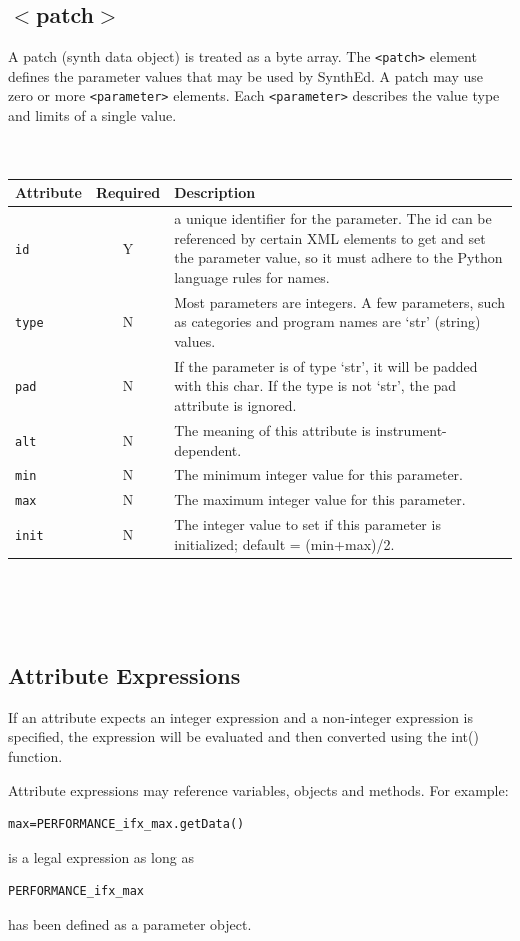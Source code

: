 \documentclass[a4paper,twoside,12pt]{article}
\newcommand{\code}[1]{\color{red}\texttt{#1}\color{black}}
\begin{document}
\subsection{$<$patch$>$}
A patch (synth data object) is treated as a byte array. The
\code{<patch>}{} element defines the parameter values that may be
used by SynthEd. A patch may use zero or more \code{<parameter>}{}
elements. Each \code{<parameter>}{} describes the value type and
limits of a single value.
\\
\\
\\
\begin{tabular}{|l|c|p{9cm}|}
\hline
Attribute & Required & Description \\
\hline \code{id} & Y & a unique identifier for the parameter. The
id can be referenced by certain XML elements to get and set the
parameter value, so it must adhere to the Python language
rules for names.  \\
\code{type} & N & Most parameters are integers. A few
parameters, such as categories and program names are `str'
(string) values. \\
\code{pad} & N & If the parameter is of type `str', it will be
padded with this char. If the type is not `str', the pad
attribute is ignored. \\
\code{alt} & N & The meaning of this attribute is instrument-dependent. \\
\code{min} & N & The minimum integer value for this parameter. \\
\code{max} & N & The maximum integer value for this parameter. \\
\code{init} & N & The integer value to set if this parameter is
initialized; default = (min+max)/2. \\
\hline
\end{tabular}
\\
\\
\\
\subsection{Attribute Expressions}

If an attribute expects an integer expression and a non-integer
expression is specified, the expression will be evaluated and then
converted using the int() function.

Attribute expressions may reference variables, objects and
methods. For example:
\begin{verbatim}max=PERFORMANCE_ifx_max.getData()\end{verbatim}
is a legal expression as long as
\begin{verbatim}PERFORMANCE_ifx_max\end{verbatim}
has been defined as a parameter object. \\
\end{document}
